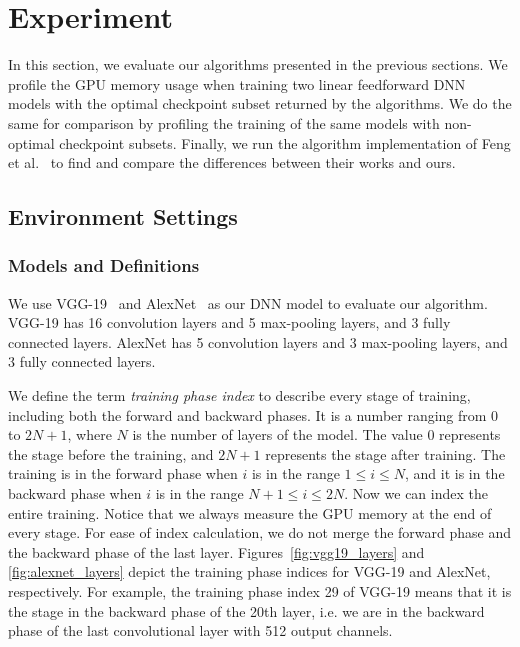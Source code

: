 \section{Experiment} \label{sec:experiment}

In this section, we evaluate our algorithms presented in the previous sections. We profile the GPU memory usage when training two linear feedforward DNN models with the optimal checkpoint subset returned by the algorithms. We do the same for comparison by profiling the training of the same models with non-optimal checkpoint subsets. Finally, we run the algorithm implementation of Feng et al.~\cite{feng2021optimal} to find and compare the differences between their works and ours.


\subsection{Environment Settings}

\subsubsection{Models and Definitions}

We use VGG-19~\cite{Simonyan2014VeryDC} and AlexNet~\cite{krizhevsky2017imagenet} as our DNN model to evaluate our algorithm.
VGG-19 has 16 convolution layers and 5 max-pooling layers, and 3 fully connected layers.
AlexNet has 5 convolution layers and 3 max-pooling layers, and 3 fully connected layers.

We define the term {\em training phase index} to describe every stage of training, including both the forward and backward phases. It is a number ranging from 0 to $2N+1$, where $N$ is the number of layers of the model. The value $0$ represents the stage before the training, and $2N+1$ represents the stage after training.
The training is in the forward phase when $i$ is in the range $1 \leq i \leq N$, and it is in the backward phase when $i$ is in the range $N+1 \leq i \leq 2N$. Now we can index the entire training.
Notice that we always measure the GPU memory at the end of every stage. For ease of index calculation, we do not merge the forward phase and the backward phase of the last layer.
Figures~\ref{fig:vgg19_layers} and \ref{fig:alexnet_layers} depict the training phase indices for VGG-19 and AlexNet, respectively. For example, the training phase index 29 of VGG-19 means that it is the stage in the backward phase of the 20th layer, i.e. we are in the backward phase of the last convolutional layer with 512 output channels.

